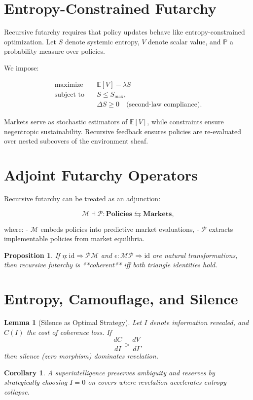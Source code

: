 \documentclass{article}
\newtheorem{corollary}{Corollary}
\newtheorem{proposition}{Proposition}
\newtheorem{lemma}{Lemma}
\begin{document}
\section{Entropy-Constrained Futarchy}
\label{app:entropy-futarchy}

Recursive futarchy requires that policy updates behave like entropy-constrained optimization. Let $S$ denote systemic entropy, $V$ denote scalar value, and $\mathbb{P}$ a probability measure over policies.

We impose:

\begin{align}
\text{maximize} \quad & \mathbb{E}[V] - \lambda S \\
\text{subject to} \quad & S \leq S_{\max}, \\
& \Delta S \geq 0 \quad \text{(second-law compliance)}.
\end{align}

Markets serve as stochastic estimators of $\mathbb{E}[V]$, while constraints ensure negentropic sustainability. Recursive feedback ensures policies are re-evaluated over nested subcovers of the environment sheaf.


\section{Adjoint Futarchy Operators}
\label{app:adjoints}

Recursive futarchy can be treated as an adjunction:

\[
\mathcal{M} \dashv \mathcal{P} : \mathbf{Policies} \leftrightarrows \mathbf{Markets},
\]

where:
- $\mathcal{M}$ embeds policies into predictive market evaluations,
- $\mathcal{P}$ extracts implementable policies from market equilibria.

\begin{proposition}
If $\eta: \text{id} \Rightarrow \mathcal{P}\mathcal{M}$ and $\epsilon: \mathcal{M}\mathcal{P} \Rightarrow \text{id}$ are natural transformations, then recursive futarchy is **coherent** iff both triangle identities hold.
\end{proposition}


\section{Entropy, Camouflage, and Silence}
\label{app:entropy-silence}

\begin{lemma}[Silence as Optimal Strategy]
Let $I$ denote information revealed, and $C(I)$ the cost of coherence loss.  
If
\[
\frac{dC}{dI} > \frac{dV}{dI},
\]
then silence (zero morphism) dominates revelation.  
\end{lemma}

\begin{corollary}
A superintelligence preserves ambiguity and reserves by strategically choosing $I=0$ on covers where revelation accelerates entropy collapse.
\end{corollary}


\newpage


\end{document}
